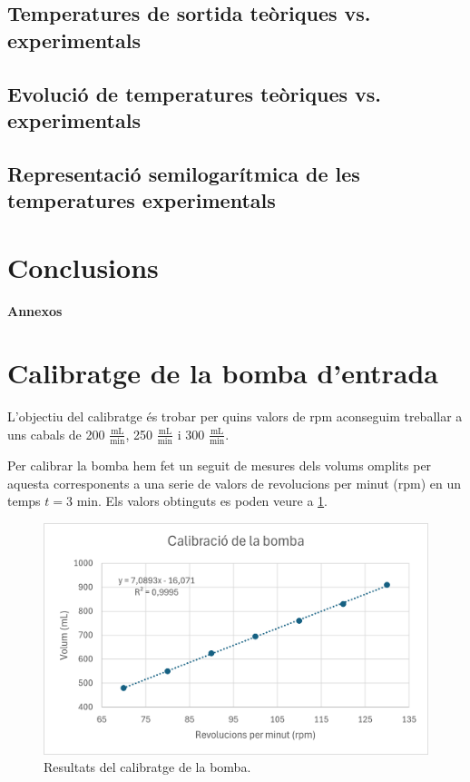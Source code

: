 \documentclass[10pt, twoside]{article}
\begin{document}
\subsection{Temperatures de sortida teòriques vs. experimentals}

\subsection{Evolució de temperatures teòriques vs. experimentals}

\subsection{Representació semilogarítmica de les temperatures experimentals}

\section{Conclusions}



\newpage
\appendix
{\Huge \textbf{Annexos}}

\section{Calibratge de la bomba d'entrada}
L'objectiu del calibratge és trobar per quins valors de rpm aconseguim treballar a uns cabals de 200 $\frac{\text{mL}}{\text{min}}$, 250 $\frac{\text{mL}}{\text{min}}$ i 300 $\frac{\text{mL}}{\text{min}}$. 

Per calibrar la bomba hem fet un seguit de mesures dels volums omplits per aquesta corresponents a una serie de valors de revolucions per minut (rpm) en un temps $t = 3$ min. Els valors obtinguts es poden veure a \ref{fig1}.

\begin{figure}[H]
    \centering
    \includegraphics[width=0.7\linewidth]{calbomba.png}
    \caption{Resultats del calibratge de la bomba.}
    \label{fig1}
\end{figure}
\end{document}
